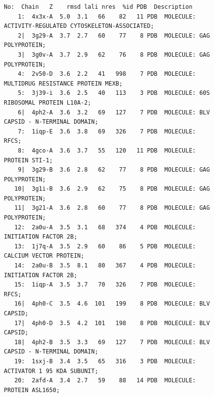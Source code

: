 \documentclass{bmcart}
\begin{document}
\begin{figure}
\centering
\begin{tiny}
\begin{Verbatim}[frame=single]
   No:  Chain   Z    rmsd lali nres  %id PDB  Description
    1:  4x3x-A  5.0  3.1   66    82   11 PDB  MOLECULE: ACTIVITY-REGULATED CYTOSKELETON-ASSOCIATED;
    2|  3g29-A  3.7  2.7   60    77    8 PDB  MOLECULE: GAG POLYPROTEIN;                                           
    3|  3g0v-A  3.7  2.9   62    76    8 PDB  MOLECULE: GAG POLYPROTEIN;                                           
    4:  2v50-D  3.6  2.2   41   998    7 PDB  MOLECULE: MULTIDRUG RESISTANCE PROTEIN MEXB;                         
    5:  3j39-i  3.6  2.5   40   113    3 PDB  MOLECULE: 60S RIBOSOMAL PROTEIN L10A-2;                              
    6|  4ph2-A  3.6  3.2   69   127    7 PDB  MOLECULE: BLV CAPSID - N-TERMINAL DOMAIN;                            
    7:  1iqp-E  3.6  3.8   69   326    7 PDB  MOLECULE: RFCS;                                                      
    8:  4gco-A  3.6  3.7   55   120   11 PDB  MOLECULE: PROTEIN STI-1;                                             
    9|  3g29-B  3.6  2.8   62    77    8 PDB  MOLECULE: GAG POLYPROTEIN;                                           
   10|  3g1i-B  3.6  2.9   62    75    8 PDB  MOLECULE: GAG POLYPROTEIN;                                           
   11|  3g21-A  3.6  2.8   60    77    8 PDB  MOLECULE: GAG POLYPROTEIN;                                           
   12:  2a0u-A  3.5  3.1   68   374    4 PDB  MOLECULE: INITIATION FACTOR 2B;                                      
   13:  1j7q-A  3.5  2.9   60    86    5 PDB  MOLECULE: CALCIUM VECTOR PROTEIN;                                    
   14:  2a0u-B  3.5  8.1   80   367    4 PDB  MOLECULE: INITIATION FACTOR 2B;                                      
   15:  1iqp-A  3.5  3.7   70   326    7 PDB  MOLECULE: RFCS;                                                      
   16|  4ph0-C  3.5  4.6  101   199    8 PDB  MOLECULE: BLV CAPSID;                                                
   17|  4ph0-D  3.5  4.2  101   198    8 PDB  MOLECULE: BLV CAPSID;                                                
   18|  4ph2-B  3.5  3.3   69   127    7 PDB  MOLECULE: BLV CAPSID - N-TERMINAL DOMAIN;                            
   19:  1sxj-B  3.4  3.5   65   316    3 PDB  MOLECULE: ACTIVATOR 1 95 KDA SUBUNIT;                                
   20:  2afd-A  3.4  2.7   59    88   14 PDB  MOLECULE: PROTEIN ASL1650;                                           
\end{Verbatim}

\end{tiny}
\end{figure}
\end{document}
